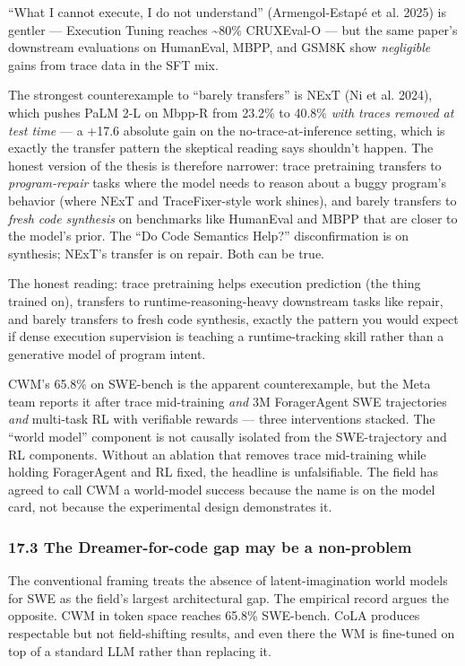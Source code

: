 \documentclass{article}
\begin{document}
``What I cannot execute, I do not understand'' (Armengol-Estapé et al.
2025) is gentler --- Execution Tuning reaches \textasciitilde80\%
CRUXEval-O --- but the same paper's downstream evaluations on HumanEval,
MBPP, and GSM8K show \emph{negligible} gains from trace data in the SFT
mix.

The strongest counterexample to ``barely transfers'' is NExT (Ni et al.
2024), which pushes PaLM 2-L on Mbpp-R from 23.2\% to 40.8\% \emph{with
traces removed at test time} --- a +17.6 absolute gain on the
no-trace-at-inference setting, which is exactly the transfer pattern the
skeptical reading says shouldn't happen. The honest version of the
thesis is therefore narrower: trace pretraining transfers to
\emph{program-repair} tasks where the model needs to reason about a
buggy program's behavior (where NExT and TraceFixer-style work shines),
and barely transfers to \emph{fresh code synthesis} on benchmarks like
HumanEval and MBPP that are closer to the model's prior. The ``Do Code
Semantics Help?'' disconfirmation is on synthesis; NExT's transfer is on
repair. Both can be true.

The honest reading: trace pretraining helps execution prediction (the
thing trained on), transfers to runtime-reasoning-heavy downstream tasks
like repair, and barely transfers to fresh code synthesis, exactly the
pattern you would expect if dense execution supervision is teaching a
runtime-tracking skill rather than a generative model of program intent.

CWM's 65.8\% on SWE-bench is the apparent counterexample, but the Meta
team reports it after trace mid-training \emph{and} 3M ForagerAgent SWE
trajectories \emph{and} multi-task RL with verifiable rewards --- three
interventions stacked. The ``world model'' component is not causally
isolated from the SWE-trajectory and RL components. Without an ablation
that removes trace mid-training while holding ForagerAgent and RL fixed,
the headline is unfalsifiable. The field has agreed to call CWM a
world-model success because the name is on the model card, not because
the experimental design demonstrates it.

\hypertarget{the-dreamer-for-code-gap-may-be-a-non-problem}{%
\subsubsection{17.3 The Dreamer-for-code gap may be a
non-problem}\label{the-dreamer-for-code-gap-may-be-a-non-problem}}

The conventional framing treats the absence of latent-imagination world
models for SWE as the field's largest architectural gap. The empirical
record argues the opposite. CWM in token space reaches 65.8\% SWE-bench.
CoLA produces respectable but not field-shifting results, and even there
the WM is fine-tuned on top of a standard LLM rather than replacing it.
\end{document}
